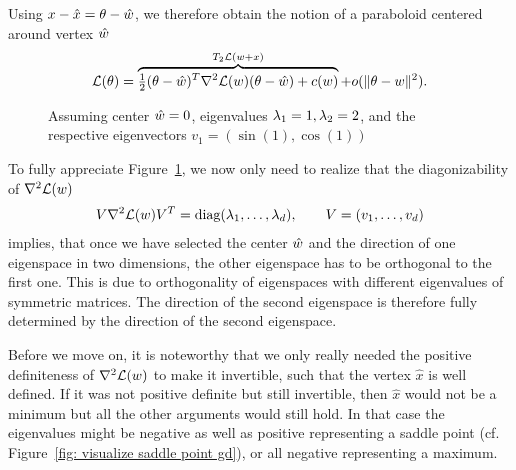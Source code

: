 %
Using \(x-\hat{x}=\theta-\hat{w}\), we therefore obtain the notion of a
paraboloid centered around vertex \(\hat{w}\)
%
\begin{align}\label{eq: paraboloid approximation of L}
	\mathcal{L}(\theta)
	= \overbrace{
		\tfrac12 (\theta- \hat{w})^T \nabla^2 \mathcal{L}(w) (\theta-\hat{w})
		+ c(w)
	}^{T_2\mathcal{L}(w+x)} + o(\|\theta-w\|^2).
\end{align}
%
\begin{wrapfigure}{O}{0.65\textwidth}
	\centering
	\def\svgwidth{0.65\textwidth}
	
	\caption{Assuming center \(\hat{w}=0\), eigenvalues \(\lambda_1=1,
	\lambda_2=2\), and the respective eigenvectors \(v_1=(\sin(1), \cos(1))\)}
	\label{fig: 2d paraboloid}
\end{wrapfigure}
%
To fully appreciate Figure~\ref{fig: 2d paraboloid}, we now only need to realize
that the diagonizability of \(\nabla^2 \mathcal{L}(w)\)
%
\begin{align}\label{eq: diagnalization of the Hesse matrix}
	V \nabla^2 \mathcal{L}(w) V^T
	= \text{diag}(\lambda_1,\dots,\lambda_d), \qquad V=(v_1,\dots, v_d)
\end{align}
%
implies, that once we have selected the center \(\hat{w}\) and the
direction of one eigenspace in two dimensions, the other eigenspace has to be
orthogonal to the first one. This is due to orthogonality of eigenspaces with
different eigenvalues of symmetric matrices. The direction of the
second eigenspace is therefore fully determined by the direction of the second
eigenspace.

Before we move on, it is noteworthy that we only really needed the positive
definiteness of \(\nabla^2 \mathcal{L}(w)\) to make it invertible, such that the
vertex \(\hat{x}\) is well defined. If it was not positive definite but still
invertible, then \(\hat{x}\) would not be a minimum but all the other arguments
would still hold.
In that case the eigenvalues might be negative as well as positive representing
a saddle point (cf. Figure~\ref{fig: visualize saddle point gd}), or all
negative representing a maximum.

